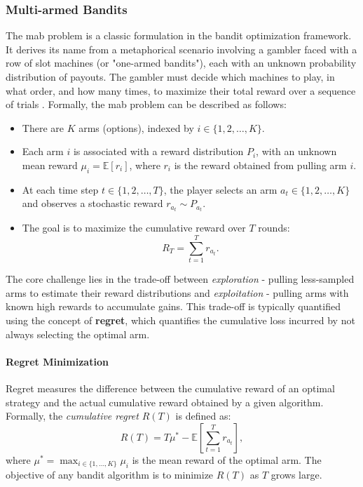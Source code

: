 \subsubsection{Multi-armed Bandits}
The \ac{mab} problem is a classic formulation in the bandit optimization framework. It derives its name from a metaphorical scenario involving a gambler faced with a row of slot machines (or "one-armed bandits"), each with an unknown probability distribution of payouts. The gambler must decide which machines to play, in what order, and how many times, to maximize their total reward over a sequence of trials \citep{robbins1952some}. Formally, the \ac{mab} problem can be described as follows:
\begin{itemize}
    \item There are $K$ arms (options), indexed by $i \in \{1, 2, \ldots, K\}$.
    \item Each arm $i$ is associated with a reward distribution $P_i$, with an unknown mean reward $\mu_i = \mathbb{E}[r_i]$, where $r_i$ is the reward obtained from pulling arm $i$.
    \item At each time step $t \in \{1, 2, \ldots, T\}$, the player selects an arm $a_t \in \{1, 2, \ldots, K\}$ and observes a stochastic reward $r_{a_t} \sim P_{a_t}$.
    \item The goal is to maximize the cumulative reward over $T$ rounds:
    \begin{equation}
        R_T = \sum_{t=1}^T r_{a_t}.
    \end{equation}
\end{itemize}

The core challenge lies in the trade-off between \textit{exploration} - pulling less-sampled arms to estimate their reward distributions and \textit{exploitation} - pulling arms with known high rewards to accumulate gains. This trade-off is typically quantified using the concept of \textbf{regret}, which quantifies the cumulative loss incurred by not always selecting the optimal arm.

\paragraph{Regret Minimization}
Regret measures the difference between the cumulative reward of an optimal strategy and the actual cumulative reward obtained by a given algorithm. Formally, the \textit{cumulative regret} $R(T)$ is defined as:
\begin{equation}
    R(T) = T \mu^* - \mathbb{E}\left[\sum_{t=1}^T r_{a_t}\right],
\end{equation}
where $\mu^* = \max_{i \in \{1, \ldots, K\}} \mu_i$ is the mean reward of the optimal arm. The objective of any bandit algorithm is to minimize $R(T)$ as $T$ grows large.

